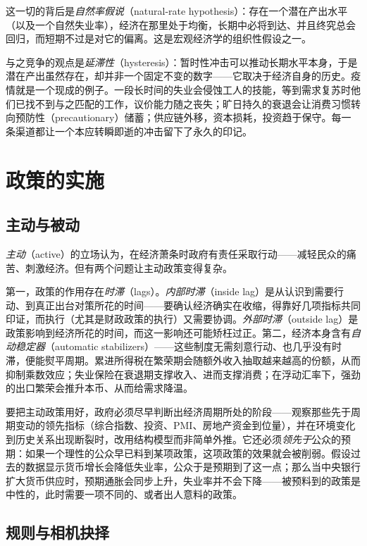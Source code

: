 这一切的背后是\emph{自然率假说}（natural-rate hypothesis）：存在一个潜在产出水平（以及一个自然失业率），经济在那里处于均衡，长期中必将到达、并且终究总会回归，而短期不过是对它的偏离。这是宏观经济学的组织性假设之一。

与之竞争的观点是\emph{延滞性}（hysteresis）：暂时性冲击可以推动长期水平本身，于是潜在产出虽然存在，却并非一个固定不变的数字——它取决于经济自身的历史。疫情就是一个现成的例子。一段长时间的失业会侵蚀工人的技能，等到需求复苏时他们已找不到与之匹配的工作，议价能力随之丧失；旷日持久的衰退会让消费习惯转向预防性（precautionary）储蓄；供应链外移，资本损耗，投资趋于保守。每一条渠道都让一个本应转瞬即逝的冲击留下了永久的印记。

\section{政策的实施}

\subsection{主动与被动}

\emph{主动}（active）的立场认为，在经济萧条时政府有责任采取行动——减轻民众的痛苦、刺激经济。但有两个问题让主动政策变得复杂。

第一，政策的作用存在\emph{时滞}（lags）。\emph{内部时滞}（inside lag）是从认识到需要行动、到真正出台对策所花的时间——要确认经济确实在收缩，得靠好几项指标共同印证，而执行（尤其是财政政策的执行）又需要协调。\emph{外部时滞}（outside lag）是政策影响到经济所花的时间，而这一影响还可能矫枉过正。第二，经济本身含有\emph{自动稳定器}（automatic stabilizers）——这些制度无需刻意行动、也几乎没有时滞，便能熨平周期。累进所得税在繁荣期会随额外收入抽取越来越高的份额，从而抑制乘数效应；失业保险在衰退期支撑收入、进而支撑消费；在浮动汇率下，强劲的出口繁荣会推升本币、从而给需求降温。

要把主动政策用好，政府必须尽早判断出经济周期所处的阶段——观察那些先于周期变动的领先指标（综合指数、投资、PMI、房地产资金到位量），并在环境变化到历史关系出现断裂时，改用结构模型而非简单外推。它还必须\emph{领先于}公众的预期：如果一个理性的公众早已料到某项政策，这项政策的效果就会被削弱。假设过去的数据显示货币增长会降低失业率，公众于是预期到了这一点；那么当中央银行扩大货币供应时，预期通胀会同步上升，失业率并不会下降——被预料到的政策是中性的，此时需要一项不同的、或者出人意料的政策。

\subsection{规则与相机抉择}


